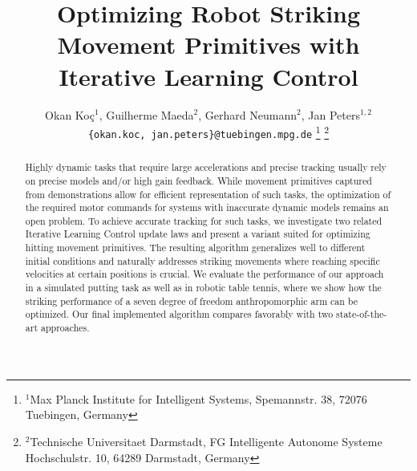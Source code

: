 \documentclass[letterpaper, 10 pt, conference]{ieeeconf}  %
\title{\LARGE \bf
Optimizing Robot Striking Movement Primitives with Iterative Learning Control
}
\author{Okan Ko\c c$^{1}$, Guilherme Maeda$^{2}$, Gerhard Neumann${^2}$, Jan Peters$^{1,2}$%
\\
{\tt\small \{okan.koc, jan.peters\}@tuebingen.mpg.de}%
\thanks{$^{1}$Max Planck Institute for Intelligent Systems,
        Spemannstr. 38, 72076 Tuebingen, Germany}
\thanks{$^{2}$Technische Universitaet Darmstadt, FG Intelligente Autonome Systeme
        Hochschulstr. 10, 64289 Darmstadt, Germany}
}
\newcommand\blue[1]{{\color{blue}#1}}
\begin{document}
\maketitle
\thispagestyle{empty}
\pagestyle{empty}

\begin{abstract}

Highly dynamic tasks that require large accelerations and precise tracking usually rely on precise models and/or high gain feedback. While
movement primitives \blue{captured from demonstrations} allow for efficient representation of such tasks, the optimization of the required motor commands for systems with inaccurate dynamic models remains an open problem.
To achieve accurate tracking for such tasks, we investigate two related Iterative Learning Control update laws and present a variant suited for optimizing hitting movement primitives. The resulting algorithm generalizes well to different initial conditions and naturally addresses striking movements where reaching specific velocities at certain positions is crucial. We evaluate the performance of our approach in a simulated putting task as well as in 
robotic table tennis,
where we show how the striking performance of a seven degree of freedom anthropomorphic arm can be optimized. Our final implemented algorithm compares favorably with two state-of-the-art approaches.

\end{abstract}








%
%

\end{document}
